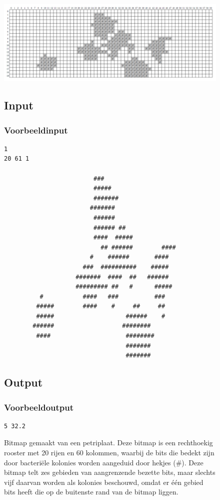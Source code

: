 \begin{figure}[H]
  \begin{center}
    \centerline{\includegraphics[scale=0.30]{koloniepikker/colony_bitmap.png}}
\caption{Bitmap gemaakt van een petriplaat. Deze bitmap is een rechthoekig rooster met 20 rijen en 60 kolommen, waarbij de bits die bedekt zijn door bacteri\"ele kolonies worden aangeduid door hekjes (\#). Deze bitmap telt zes gebieden van aangrenzende bezette bits, maar slechts vijf daarvan worden als kolonies beschouwd, omdat er \'e\'en gebied bits heeft die op de buitenste rand van de bitmap liggen.}
  \end{center}

\subsection*{Input}
\subsubsection*{Voorbeeldinput}
\begin{verbatim}
1
20 61 1
                                                            
                         ###                                
                         #####                              
                         #######                            
                        #######                             
                         ######                             
                         ###### ##                          
                         ####  #####                        
                           ## ######        ####            
                        #    ######       ####              
                      ###  ##########    #####              
                    #######  ####  ##   ######              
                    ######### ##   #      #####             
          #           ####   ###          ###               
         #####        ####    #     ##     ##               
         #####                    ######    #               
        ######                   ########                   
         ####                     ########                  
                                  #######                   
                                  #######     
\end{verbatim}
\subsection*{Output}
\subsubsection*{Voorbeeldoutput}
\begin{verbatim}
5 32.2
\end{verbatim}

\end{figure}